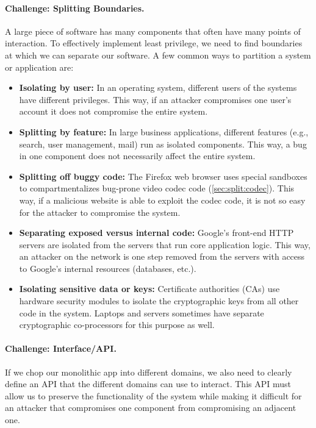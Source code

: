 \paragraph{Challenge: Splitting Boundaries.} 
A large piece of software has many components that often have many points of interaction.
To effectively implement least privilege, we need to find
boundaries at which we can separate our software. 
A few common ways to partition a system or application are:
\begin{itemize}
  \item \textbf{Isolating by user:} In an operating system, different users of the systems
                      have different privileges. This way, if an attacker compromises
                      one user's account it does not compromise the entire system.

\item \textbf{Splitting by feature:} In large business applications, different features
        (e.g., search, user management, mail) run as isolated components.
        This way, a bug in one component does not necessarily affect the entire system.
\item \textbf{Splitting off buggy code:} The Firefox web browser uses special sandboxes to compartmentalizes bug-prone video codec code (\cref{sec:split:codec}).
  This way, if a malicious website is able to exploit the codec code, it is not
    so easy for the attacker to compromise the system.
\item \textbf{Separating exposed versus internal code:} Google's front-end HTTP servers 
    are isolated from the servers that run core application logic.
    This way, an attacker on the network is one step removed from the
    servers with access to Google's internal resources (databases, etc.).

  \item \textbf{Isolating sensitive data or keys:} Certificate authorities (CAs) use hardware security modules to isolate the cryptographic keys from all other code in the system. Laptops and servers sometimes have separate cryptographic co-processors for this purpose as well. 

\end{itemize}

\paragraph{Challenge: Interface/API.}
If we chop our monolithic app into different
domains, we also need to clearly define an API
that the different domains can use to interact. 
This API must allow us to preserve the
functionality of the system while making it difficult
for an attacker that compromises one component from
compromising an adjacent one.

